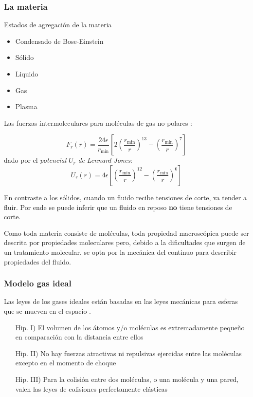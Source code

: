 \subsubsection*{La materia}

Estados de agregación de la materia
\begin{itemize}
    \item Condensado de Bose-Einstein
    \item Sólido
    \item Liquido
    \item Gas
    \item Plasma 
\end{itemize}



Las fuerzas intermoleculares para moléculas de gas no-polares \citep{bird2002transport}: 

\[
F_r(r)=\frac{24 \epsilon}{r_{\min}}\left[ 2\left( \frac{r_{\min}}{r}\right)^{13} - \left( \frac{r_{\min}}{r} \right)^7 \right]
\]
dado por el \textit{potencial} $U_r$ \textit{de} \textit{Lennard-Jones}:
\[
U_r(r) = 4\epsilon \left[ \left(\frac{r_{\min}}{r}\right)^{12} - \left( \frac{r_{\min}}{r}\right)^6 \right] 
\]

En contraste a los sólidos, cuando un fluido recibe tensiones de corte, va tender a fluir. Por ende se puede inferir que un fluido en reposo \textbf{no} tiene tensiones de corte. 

Como toda materia consiste de moléculas, toda propiedad macroscópica puede ser descrita por propiedades moleculares pero, debido a la dificultades que surgen de un tratamiento molecular, se opta por la mecánica del continuo para describir propiedades del fluido\citep{durst2008fluid}. 
\subsubsection*{Modelo gas ideal}

Las leyes de los gases ideales están basadas en las leyes mecánicas para esferas que se mueven en el espacio \citep{durst2008fluid}.
\begin{itemize} 
    \item[Hip. I)] El volumen de los átomos y/o moléculas es extremadamente pequeño en comparación con la distancia entre ellos
    \item[Hip. II)] No hay fuerzas atractivas ni repulsivas ejercidas entre las moléculas excepto en el momento de choque
    \item[Hip. III)] Para la colisión entre dos moléculas, o una molécula y una pared, valen las leyes de colisiones perfectamente elásticas 
\end{itemize}

